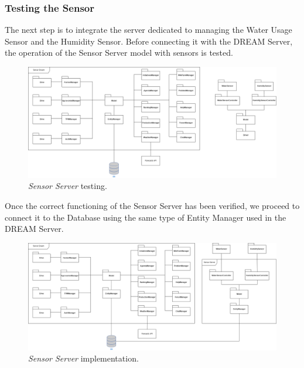 \subsubsection{Testing the Sensor}
The next step is to integrate the server dedicated to managing the Water Usage Sensor and the Humidity Sensor. Before connecting it with the DREAM Server, the operation of the Sensor Server model with sensors is tested.
\begin{figure}[H]
    \centering
    \includegraphics[width=\textwidth]{Images/StepImplementation/Step5.png}
    \caption{\textit{Sensor Server} testing.}
\end{figure}
Once the correct functioning of the Sensor Server has been verified, we proceed to connect it to the Database using the same type of Entity Manager used in the DREAM Server.
\begin{figure}[H]
    \centering
    \includegraphics[width=\textwidth]{Images/StepImplementation/Step6.png}
    \caption{\textit{Sensor Server} implementation.}
\end{figure}
\newpage
